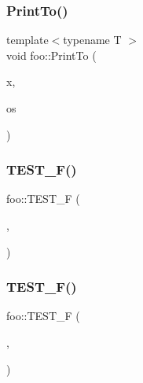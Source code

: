 \mbox{\label{namespacefoo_a7b78eba501ea7ff1226a8cb40b6e3d92}} 
\subsubsection{\texorpdfstring{PrintTo()}{PrintTo()}\hspace{0.1cm}{\footnotesize\ttfamily [2/2]}}
{\footnotesize\ttfamily template$<$typename T $>$ \\
void foo\+::\+Print\+To (\begin{DoxyParamCaption}\item[{const \mbox{\hyperlink{classfoo_1_1PrintableViaPrintToTemplate}{Printable\+Via\+Print\+To\+Template}}$<$ T $>$ \&}]{x,  }\item[{\+::std\+::ostream $\ast$}]{os }\end{DoxyParamCaption})}

\mbox{\label{namespacefoo_a0d50eecc97df56ae625078848ba9c98a}} 
\subsubsection{\texorpdfstring{TEST\_F()}{TEST\_F()}\hspace{0.1cm}{\footnotesize\ttfamily [1/3]}}
{\footnotesize\ttfamily foo\+::\+T\+E\+S\+T\+\_\+F (\begin{DoxyParamCaption}\item[{\mbox{\hyperlink{classfoo_1_1MixedUpTestCaseTest}{Mixed\+Up\+Test\+Case\+Test}}}]{,  }\item[{First\+Test\+From\+Namespace\+Foo}]{ }\end{DoxyParamCaption})}

\mbox{\label{namespacefoo_a7911fd62b6ae405016caed779b2f95dc}} 
\subsubsection{\texorpdfstring{TEST\_F()}{TEST\_F()}\hspace{0.1cm}{\footnotesize\ttfamily [2/3]}}
{\footnotesize\ttfamily foo\+::\+T\+E\+S\+T\+\_\+F (\begin{DoxyParamCaption}\item[{\mbox{\hyperlink{classfoo_1_1MixedUpTestCaseTest}{Mixed\+Up\+Test\+Case\+Test}}}]{,  }\item[{Second\+Test\+From\+Namespace\+Foo}]{ }\end{DoxyParamCaption})}

